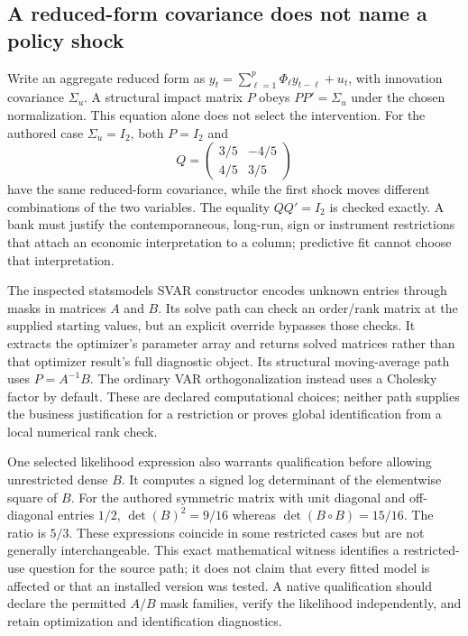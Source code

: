\subsection{A reduced-form covariance does not name a policy shock}

Write an aggregate reduced form as $y_t=\sum_{\ell=1}^p\Phi_\ell y_{t-\ell}+u_t$, with innovation covariance $\Sigma_u$. A structural impact matrix $P$ obeys $PP'=\Sigma_u$ under the chosen normalization. This equation alone does not select the intervention. For the authored case $\Sigma_u=I_2$, both $P=I_2$ and
\[
 Q=\begin{pmatrix}3/5&-4/5\\4/5&3/5\end{pmatrix}
\]
have the same reduced-form covariance, while the first shock moves different combinations of the two variables. The equality $QQ'=I_2$ is checked exactly. A bank must justify the contemporaneous, long-run, sign or instrument restrictions that attach an economic interpretation to a column; predictive fit cannot choose that interpretation.\citep{exec25_pydyn_choice}

The inspected statsmodels SVAR constructor encodes unknown entries through masks in matrices $A$ and $B$. Its solve path can check an order/rank matrix at the supplied starting values, but an explicit override bypasses those checks. It extracts the optimizer's parameter array and returns solved matrices rather than that optimizer result's full diagnostic object. Its structural moving-average path uses $P=A^{-1}B$. The ordinary VAR orthogonalization instead uses a Cholesky factor by default. These are declared computational choices; neither path supplies the business justification for a restriction or proves global identification from a local numerical rank check.\citep{exec25_pydyn_statsmodels}

One selected likelihood expression also warrants qualification before allowing unrestricted dense $B$. It computes a signed log determinant of the elementwise square of $B$. For the authored symmetric matrix with unit diagonal and off-diagonal entries $1/2$, $\det(B)^2=9/16$ whereas $\det(B\circ B)=15/16$. The ratio is $5/3$. These expressions coincide in some restricted cases but are not generally interchangeable. This exact mathematical witness identifies a restricted-use question for the source path; it does not claim that every fitted model is affected or that an installed version was tested. A native qualification should declare the permitted $A/B$ mask families, verify the likelihood independently, and retain optimization and identification diagnostics.\citep{exec25_pydyn_statsmodels,exec25_pydyn_choice}

